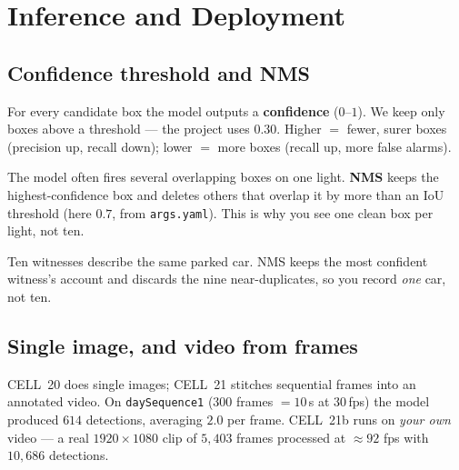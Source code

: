 
\chapter{Inference and Deployment}
\label{ch:deploy}

\section{Confidence threshold and NMS}
\label{sec:nms}
\begin{keyconcept}
For every candidate box the model outputs a \textbf{confidence}
($0$--$1$). We keep only boxes above a threshold --- the project uses
\textbf{$0.30$}. Higher $=$ fewer, surer boxes (precision up, recall
down); lower $=$ more boxes (recall up, more false alarms).
\end{keyconcept}

\begin{keyconcept}
The model often fires several overlapping boxes on one light.
\textbf{NMS} keeps the highest-confidence box and deletes others that
overlap it by more than an IoU threshold (here $0.7$, from
\texttt{args.yaml}). This is why you see one clean box per light, not ten.
\end{keyconcept}

\begin{analogy}
Ten witnesses describe the same parked car. NMS keeps the most confident
witness's account and discards the nine near-duplicates, so you record
\emph{one} car, not ten.
\end{analogy}

\section{Single image, and video from frames}
CELL~20 does single images; CELL~21 stitches sequential frames into an
annotated video. On \texttt{daySequence1} ($300$ frames $=10$\,s at
$30$\,fps) the model produced $614$ detections, averaging $2.0$ per
frame. CELL~21b runs on \emph{your own} video --- a real $1920\times1080$
clip of $5{,}403$ frames processed at $\approx 92$ fps with $10{,}686$
detections.

